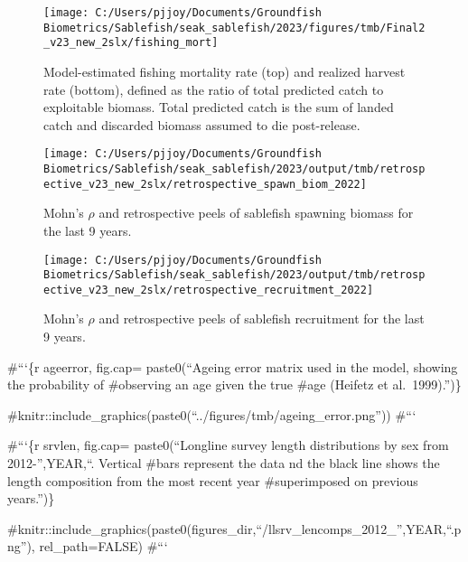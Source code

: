 \documentclass[
]{article}
\begin{document}
\begin{figure}[H]

{\centering \texttt{[image: C:/Users/pjjoy/Documents/Groundfish Biometrics/Sablefish/seak\_sablefish/2023/figures/tmb/Final2\_v23\_new\_2slx/fishing\_mort]} 

}

\caption{Model-estimated fishing mortality rate (top) and realized harvest rate (bottom), defined as the ratio of total predicted catch to exploitable biomass. Total predicted catch is the sum of landed catch and discarded biomass assumed to die post-release.}\label{fig:fishmort}
\end{figure}

\begin{figure}[H]

{\centering \texttt{[image: C:/Users/pjjoy/Documents/Groundfish Biometrics/Sablefish/seak\_sablefish/2023/output/tmb/retrospective\_v23\_new\_2slx/retrospective\_spawn\_biom\_2022]} 

}

\caption{Mohn's $\rho$ and retrospective peels of sablefish spawning biomass for the last 9 years.}\label{fig:mohnsbiom}
\end{figure}

\begin{figure}[H]

{\centering \texttt{[image: C:/Users/pjjoy/Documents/Groundfish Biometrics/Sablefish/seak\_sablefish/2023/output/tmb/retrospective\_v23\_new\_2slx/retrospective\_recruitment\_2022]} 

}

\caption{Mohn's $\rho$ and retrospective peels of sablefish recruitment for the last 9 years.}\label{fig:mohnsrec}
\end{figure}

\#```\{r ageerror, fig.cap= paste0(``Ageing error matrix used in the
model, showing the probability of \#observing an age given the true
\#age (Heifetz et al.~1999).'')\}

\#knitr::include\_graphics(paste0(``../figures/tmb/ageing\_error.png''))
\#```

\#```\{r srvlen, fig.cap= paste0(``Longline survey length distributions
by sex from 2012-'',YEAR,``. Vertical \#bars represent the data nd the
black line shows the length composition from the most recent year
\#superimposed on previous years.'')\}

\#knitr::include\_graphics(paste0(figures\_dir,``/llsrv\_lencomps\_2012\_'',YEAR,``.png''),
rel\_path=FALSE) \#```
\end{document}
